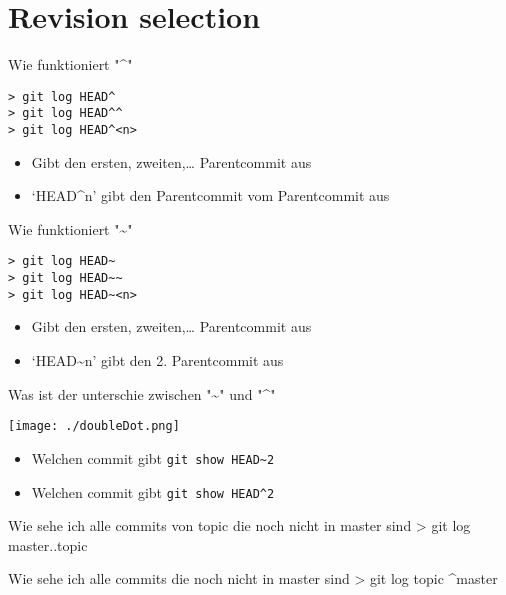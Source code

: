 \documentclass[presentation, smaller]{beamer}
\begin{document}
\section{Revision selection}
\label{sec:org0d2ee4d}
\begin{frame}[fragile,label={sec:orgbe9ed73}]{Wie funktioniert "\^{}"}
 \begin{verbatim}
> git log HEAD^
> git log HEAD^^
> git log HEAD^<n>
\end{verbatim}
\begin{itemize}
\item Gibt den ersten, zweiten,\ldots{} Parentcommit aus
\item `HEAD\^{}n' gibt den Parentcommit vom Parentcommit aus
\end{itemize}
\end{frame}
\begin{frame}[fragile,label={sec:orga7b5fed}]{Wie funktioniert "\textasciitilde{}"}
 \begin{verbatim}
> git log HEAD~
> git log HEAD~~
> git log HEAD~<n>
\end{verbatim}
\begin{itemize}
\item Gibt den ersten, zweiten,\ldots{} Parentcommit aus
\item `HEAD\textasciitilde{}n' gibt den 2. Parentcommit aus
\end{itemize}
\end{frame}
\begin{frame}[fragile,label={sec:org5314215}]{Was ist der unterschie zwischen "\textasciitilde{}" und "\^{}"}
 \begin{center}
\texttt{[image: ./doubleDot.png]}
\end{center}
\begin{itemize}
\item Welchen commit gibt \texttt{git show HEAD\textasciitilde{}2}
\item Welchen commit gibt \texttt{git show HEAD\textasciicircum{}2}
\end{itemize}
\end{frame}
\begin{frame}[label={sec:org22fca15}]{Wie sehe ich alle commits von topic die noch nicht in master sind}
>  git log master..topic
\end{frame}
\begin{frame}[label={sec:orgae633bb}]{Wie sehe ich alle commits die noch nicht in master sind}
> git log topic \^{}master
\end{frame}
\end{document}
